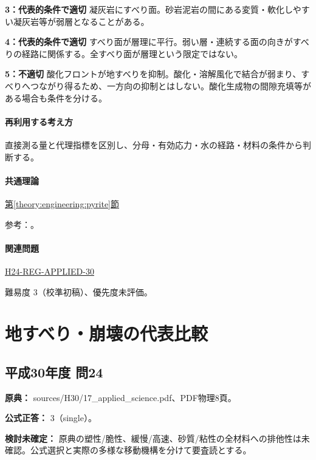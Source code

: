 \noindent\textbf{3：代表的条件で適切} 凝灰岩にすべり面。砂岩泥岩の間にある変質・軟化しやすい凝灰岩等が弱層となることがある。\par

\noindent\textbf{4：代表的条件で適切} すべり面が層理に平行。弱い層・連続する面の向きがすべりの経路に関係する。全すべり面が層理という限定ではない。\par

\noindent\textbf{5：不適切} 酸化フロントが地すべりを抑制。酸化・溶解風化で結合が弱まり、すべりへつながり得るため、一方向の抑制とはしない。酸化生成物の間隙充填等がある場合も条件を分ける。\par

\paragraph{再利用する考え方} 直接測る量と代理指標を区別し、分母・有効応力・水の経路・材料の条件から判断する。

\paragraph{共通理論} \hyperref[theory:engineering:pyrite]{第\ref*{theory:engineering:pyrite}節}

\par 参考：\cite{eng52_weathering,eng52_slip_weaklayer}。

\paragraph{関連問題} \hyperref[q:h24-reg-applied-30]{H24-REG-APPLIED-30}

\par 難易度 3（校準初稿）、優先度未評価。

\section{地すべり・崩壊の代表比較}

\subsection{平成30年度 問24}
\label{q:h30-reg-applied-24}

\noindent\textbf{原典：} sources/H30/17\_applied\_science.pdf、PDF物理8頁。

\textbf{公式正答：} 3（single）。

\par\textbf{検討未確定：} 原典の塑性/脆性、緩慢/高速、砂質/粘性の全材料への排他性は未確認。公式選択と実際の多様な移動機構を分けて要査読とする。

